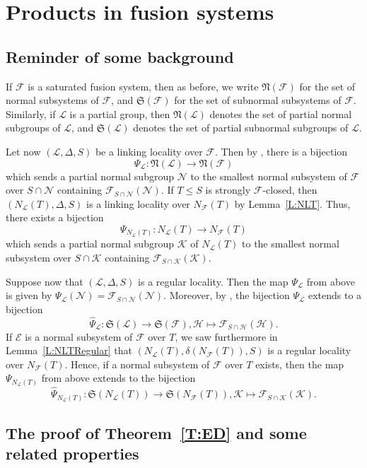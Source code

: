 \documentclass[reqno,11pt]{amsart}
\numberwithin{equation}{section}
\theoremstyle{definition}
\newcommand{\F}{\mathcal{F}}
\newcommand{\E}{\mathcal{E}}
\renewcommand{\L}{\mathcal{L}}
\newcommand{\N}{\mathcal{N}}
\newcommand{\K}{\mathcal{K}}
\renewcommand{\H}{\mathcal{H}}
\newcommand{\fN}{\mathfrak{N}}
\newcommand{\fS}{\mathfrak{S}}
\begin{document}
\section{Products in fusion systems}



\subsection{Reminder of some background}\label{SS:PsiL}

If $\F$ is a saturated fusion system, then as before, we  write $\fN(\F)$ for the set of normal subsystems of $\F$, and $\fS(\F)$ for the set of subnormal subsystems of $\F$. Similarly, if $\L$ is a partial group, then $\fN(\L)$ denotes the set of partial normal subgroups of $\L$, and $\fS(\L)$ denotes the set of partial subnormal subgroups of $\L$.

\smallskip

Let now $(\L,\Delta,S)$ be a linking locality over $\F$. Then by \cite[Theorem~A]{Chermak/Henke}, there is a bijection
\[\Psi_\L\colon\fN(\L)\rightarrow\fN(\F)\]
which sends a partial normal subgroup $\N$ to the smallest normal subsystem of $\F$ over $S\cap\N$ containing $\F_{S\cap\N}(\N)$. If $T\leq S$ is strongly $\F$-closed, then $(N_\L(T),\Delta,S)$ is a linking locality over $N_\F(T)$ by Lemma~\ref{L:NLT}. Thus, there exists a bijection
\[\Psi_{N_\L(T)}\colon N_\L(T)\rightarrow N_\F(T)\]
which sends a partial normal subgroup $\K$ of $N_\L(T)$ to the smallest normal subsystem over $S\cap\K$ containing $\F_{S\cap\K}(\K)$.

\smallskip

Suppose now that $(\L,\Delta,S)$ is a regular locality. Then the map $\Psi_\L$ from above is given by $\Psi_\L(\N)=\F_{S\cap\N}(\N)$. Moreover, by \cite[Theorem~F]{Chermak/Henke}, the bijection $\Psi_\L$ extends to a bijection
\[\hat{\Psi}_\L\colon\fS(\L)\rightarrow \fS(\F),\H\mapsto\F_{S\cap\H}(\H).\]
If $\E$ is a normal subsystem of $\F$ over $T$, we saw furthermore in Lemma~\ref{L:NLTRegular} that $(N_\L(T),\delta(N_\F(T)),S)$ is a regular locality over $N_\F(T)$. Hence, if a normal subsystem of $\F$ over $T$ exists, then the map $\Psi_{N_\L(T)}$ from above extends to the bijection
\[\hat{\Psi}_{N_\L(T)}\colon\fS(N_\L(T))\rightarrow \fS(N_\F(T)),\K\mapsto \F_{S\cap\K}(\K).\]

\subsection{The proof of Theorem~\ref{T:ED} and some related properties}
\end{document}
